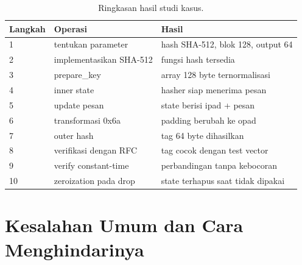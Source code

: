 \documentclass[11pt,a4paper]{article}
\begin{document}
\begin{table}[H]
	\centering
	\caption{Ringkasan hasil studi kasus.}
	\label{tab:case-summary}
	\small
	\begin{tabularx}{\textwidth}{l X X}
		\toprule
		Langkah & Operasi                 & Hasil                             \\
		\midrule
		1       & tentukan parameter      & hash SHA-512, blok 128, output 64 \\
		2       & implementasikan SHA-512 & fungsi hash tersedia              \\
		3       & prepare\_key            & array 128 byte ternormalisasi     \\
		4       & inner state             & hasher siap menerima pesan        \\
		5       & update pesan            & state berisi ipad + pesan         \\
		6       & transformasi 0x6a       & padding berubah ke opad           \\
		7       & outer hash              & tag 64 byte dihasilkan            \\
		8       & verifikasi dengan RFC   & tag cocok dengan test vector      \\
		9       & verify constant-time    & perbandingan tanpa kebocoran      \\
		10      & zeroization pada drop   & state terhapus saat tidak dipakai \\
		\bottomrule
	\end{tabularx}
\end{table}

\section{Kesalahan Umum dan Cara Menghindarinya}
\end{document}
